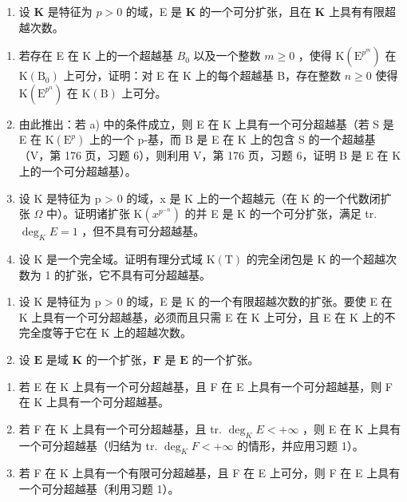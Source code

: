 \BourbakiExerciseGroup

\begin{enumerate}
\def\labelenumi{\arabic{enumi})}
\tightlist
\item
  设 \(\mathbf{K}\) 是特征为 \(p > 0\) 的域，E 是 \(\mathbf{K}\) 的一个可分扩张，且在 \(\mathbf{K}\) 上具有有限超越次数。
\end{enumerate}

\begin{enumerate}
\def\labelenumi{\alph{enumi})}
\item
  若存在 E 在 K 上的一个超越基 \(B_{0}\) 以及一个整数 \(m \geqslant 0\) ，使得 \(\mathrm{K}(\mathrm{E}^{p^{m}})\) 在 \(\mathrm{K}(\mathrm{B}_{0})\) 上可分，证明：对 E 在 K 上的每个超越基 B，存在整数 \(n \geqslant 0\) 使得 \(\mathrm{K}(\mathrm{E}^{p^{n}})\) 在 \(\mathrm{K}(\mathrm{B})\) 上可分。
\item
  由此推出：若 a) 中的条件成立，则 E 在 K 上具有一个可分超越基（若 S 是 E 在 \(\mathrm{K}(\mathrm{E}^{p})\) 上的一个 p-基，而 B 是 E 在 K 上的包含 S 的一个超越基（V，第 176 页，习题 6），则利用 V，第 176 页，习题 6，证明 B 是 E 在 K 上的一个可分超越基）。
\item
  设 K 是特征为 p \textgreater{} 0 的域，x 是 K 上的一个超越元（在 K 的一个代数闭扩张 \(\Omega\) 中）。证明诸扩张 \(\mathrm{K}(x^{p^{-n}})\) 的并 E 是 K 的一个可分扩张，满足 tr. \(\deg_{K}E = 1\) ，但不具有可分超越基。
\item
  设 K 是一个完全域。证明有理分式域 \(\mathrm{K}(\mathrm{T})\) 的完全闭包是 K 的一个超越次数为 1 的扩张，它不具有可分超越基。
\end{enumerate}

\begin{enumerate}
\def\labelenumi{\arabic{enumi})}
\setcounter{enumi}{1}
\item
  设 K 是特征为 p \textgreater{} 0 的域，E 是 K 的一个有限超越次数的扩张。要使 E 在 K 上具有一个可分超越基，必须而且只需 E 在 K 上可分，且 E 在 K 上的不完全度等于它在 K 上的超越次数。
\item
  设 \(\mathbf{E}\) 是域 \(\mathbf{K}\) 的一个扩张，\(\mathbf{F}\) 是 \(\mathbf{E}\) 的一个扩张。
\end{enumerate}

\begin{enumerate}
\def\labelenumi{\alph{enumi})}
\item
  若 E 在 K 上具有一个可分超越基，且 F 在 E 上具有一个可分超越基，则 F 在 K 上具有一个可分超越基。
\item
  若 F 在 K 上具有一个可分超越基，且 tr. \(\deg_{K}E<+\infty\) ，则 E 在 K 上具有一个可分超越基（归结为 tr. \(\deg_{K}F<+\infty\) 的情形，并应用习题 1）。
\item
  若 F 在 K 上具有一个有限可分超越基，且 F 在 E 上可分，则 F 在 E 上具有一个可分超越基（利用习题 1）。
\end{enumerate}

